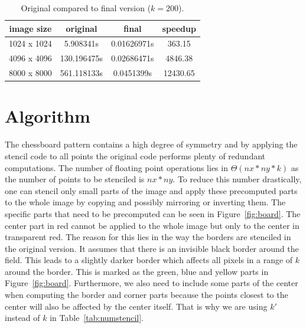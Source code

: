 \documentclass[letterpaper,twocolumn,10pt]{article}
\begin{document}
\begin{table}[ht]
	\vspace{-0.2in}
	\caption{Original compared to final version ($k=200$).}
	\begin{tabular}{c c c c}
		 image size & original & final & speedup \\
		 \hline
		1024 x 1024 & 5.908341s   & 0.01626971s & 363.15\\
		4096 x 4096 & 130.196475s & 0.02686471s & 4846.38\\
		8000 x 8000 & 561.118133s & 0.0451399s & 12430.65\\
	\end{tabular}
	\label{tab:final}
	\vspace{-0.3in}
\end{table}

\section*{Algorithm}
The chessboard pattern contains a high degree of symmetry and by applying the stencil code
to all points the original code performs plenty of redundant computations.
The number of floating point operations lies in $\Theta(nx * ny * k)$
as the number of points to be stenciled is $nx * ny$.
To reduce this number drastically, one can stencil only small parts of the image and apply
these precomputed parts to the whole image by copying and possibly mirroring or inverting them.
The specific parts that need to be precomputed can be seen
in Figure~\ref{fig:board}. The center part in red cannot
be applied to the whole image but only to the center in transparent red.
The reason for this lies in the way the borders are stenciled in the original version. It assumes
that there is an invisible black border around the field. This leads to a slightly darker border
which affects all pixels in a range of $k$ around the border. This is marked as the
green, blue and yellow parts in Figure~\ref{fig:board}. Furthermore, we also need to include some parts of the center when computing the border and corner parts because the points closest to the center will also be affected by the center itself. That is why we are using $k'$ instead of $k$ in Table~\ref{tab:numstencil}.
\end{document}
